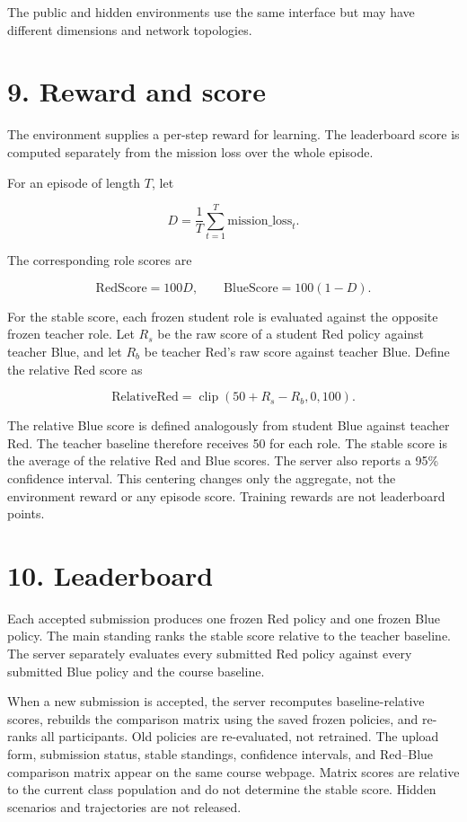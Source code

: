 \documentclass[12pt]{report}
\begin{document}
The public and hidden environments use the same interface but may have
different dimensions and network topologies.

\section*{9. Reward and score}

The environment supplies a per-step reward for learning. The leaderboard score
is computed separately from the mission loss over the whole episode.

For an episode of length $T$, let

\[
D = \frac{1}{T}\sum_{t=1}^{T}\text{mission\_loss}_t.
\]

The corresponding role scores are

\[
\text{RedScore}=100D,
\qquad
\text{BlueScore}=100(1-D).
\]

For the stable score, each frozen student role is evaluated against the
opposite frozen teacher role. Let $R_s$ be the raw score of a student Red
policy against teacher Blue, and let $R_b$ be teacher Red's raw score against
teacher Blue. Define the relative Red score as

\[
\text{RelativeRed}=\operatorname{clip}(50+R_s-R_b,0,100).
\]

The relative Blue score is defined analogously from student Blue against
teacher Red. The teacher baseline therefore receives 50 for each role. The
stable score is the average of the relative Red and Blue scores. The server
also reports a 95\% confidence interval. This centering changes only the
aggregate, not the environment reward or any episode score. Training rewards
are not leaderboard points.

\section*{10. Leaderboard}

Each accepted submission produces one frozen Red policy and one frozen Blue
policy. The main standing ranks the stable score relative to the teacher
baseline. The server separately evaluates every submitted Red policy against
every submitted Blue policy and the course baseline.

When a new submission is accepted, the server recomputes baseline-relative
scores, rebuilds the comparison matrix using the saved frozen policies, and
re-ranks all participants. Old policies are re-evaluated, not retrained.
The upload form, submission status, stable standings, confidence intervals,
and Red--Blue comparison matrix appear on the same course webpage. Matrix
scores are relative to the current class population and do not determine the
stable score. Hidden scenarios and trajectories are not released.
\end{document}
